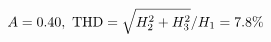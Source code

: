 \documentclass[preview]{standalone}
\begin{document}
\begin{align*}
\special{dvisvgm:raw <g id='unique000'>}A=0.40,\ \text{THD}=\sqrt{H_2^2+H_3^2}/H_1=7.8\%\special{dvisvgm:raw </g>}
\end{align*}
\end{document}
